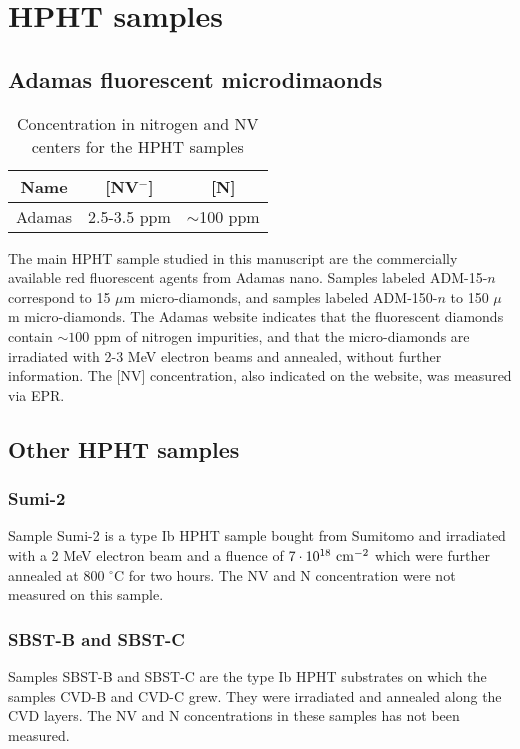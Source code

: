 \documentclass[a4paper,11pt]{report}
\begin{document}
\section{HPHT samples}
\subsection{Adamas fluorescent microdimaonds}
\begin{table}[htbp]
\centering
\caption{Concentration in nitrogen and NV centers for the HPHT samples}
\label{Table samples adamas}
\begin{tabular}{c|cc}
\toprule
Name &  [NV$^-$] & [N] \\
\midrule
Adamas & 2.5-3.5 ppm & $\sim$100 ppm \\

\bottomrule
\end{tabular}
\end{table}

The main HPHT sample studied in this manuscript are the commercially available red fluorescent agents from Adamas nano. Samples labeled ADM-15-$n$ correspond to 15 $\mu$m micro-diamonds, and samples labeled ADM-150-$n$ to 150 $\mu$m micro-diamonds. The Adamas website indicates that the fluorescent diamonds contain $\sim 100$ ppm of nitrogen impurities, and that the micro-diamonds are irradiated with 2-3 MeV electron beams and annealed, without further information. The [NV] concentration, also indicated on the website, was measured via EPR.

\subsection{Other HPHT samples}
\subsubsection{Sumi-2}
Sample Sumi-2 is a type Ib HPHT sample bought from Sumitomo and irradiated with a 2 MeV electron beam and a fluence of $7\cdot 10^{18}\ \rm cm^{-2}$ which were further annealed at 800 $^\circ$C for two hours. The NV and N concentration were not measured on this sample.
\subsubsection{SBST-B and SBST-C}
Samples SBST-B and SBST-C are the type Ib HPHT substrates on which the samples CVD-B and CVD-C grew. They were irradiated and annealed along the CVD layers. The NV and N concentrations in these samples has not been measured.
\printbibliography
\end{document}
